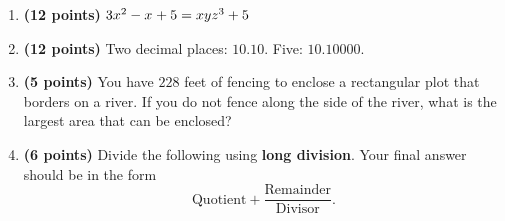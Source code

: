 \documentclass[12pt]{amsart}
\begin{document}
\begin{enumerate}
\item {\bf (12 points)} 
  $\nicethreefour = \nastythreefour$ 
\vfill 
\def \a{7}\def \atwoone{2}\def \atwotwo{-2}\def \atwothree{3}\def \btwothree{8}\def \sumtwothree{11}\def \diftwothree{-5}\def \bigtwothree{300}\def \powtwothree{512}\def \logtwothree{0.5283208335737188}\def \factortwothree{119}\def \atwofour{1.92}\def \btwofour{1.553}\def \tooshorttwofour{10.1}\def \moneytwofour{10.10}\def \longertwofour{10.10000}\def \atwofive{0.12}\def \btwofive{0.12346}\def \athreeone{6}\def \bthreeone{8}\def \setthreetwo{[3, 7, 7]}\def \athreetwo{3}\def \bthreetwo{7}\def \cthreetwo{7}\def \controlthreethree{4}\def \athreethree{2}\def \topthreethree{1}\def \athreefour{5}\def \bthreefour{1}\def \listthreefour{[1, 2, 3, 4]}\def \afourone{8}\def \bfourone{4}\def \fracfourone{2}\def \rootfourtwo{12}\def \simplifiedfourtwo{2 \sqrt{3}}\def \sqrtlistfourtwo{[2, 3]}\def \outfourtwo{2}\def \infourtwo{3}\def \wowfourtwo{1}\def \afourthree{5}\def \nicethreefour{3x^{2}-x^{}+5}\def \nastythreefour{xyz^{3}+5}\def \cfourthree{-4}\def \dfourthree{-10}\def \infourthree{-4x^{}}\def \outfourthree{-10y^{}}\def \afourfour{1407093}\def \nicefourfour{1,407,093}\def \goodfourfour{1,000,000.12345}\def \badfourfour{1,000,000.1}
\item {\bf (12 points)} 
 Two decimal places: $\moneytwofour$. Five: $\longertwofour$. 
\vfill 
\newpage\def \x{57}\def \y{114}\def \L{228}\def \area{6498}
\item {\bf (5 points)} 
 You have $\L$ feet of fencing to enclose a rectangular plot that borders on a river. If you do not fence along the side of the river, what is the largest area that can be enclosed? \\

  
\vfill \vfill \vfill
\def \a{6}\def \b{4}\def \c{-8}\def \r{9}\def \monicpol{x^{}+6}\def \longnbad{4x^{2}+16x^{}-39}\def \anspol{4x^{}-8}
\item {\bf (6 points)} 
 Divide the following using {\bf long division}. Your final answer should be in the form $$ \text{Quotient} + \dfrac{\text{Remainder}}{\text{Divisor}}.$$

\vspace{3mm}


\end{enumerate}
\end{document}
